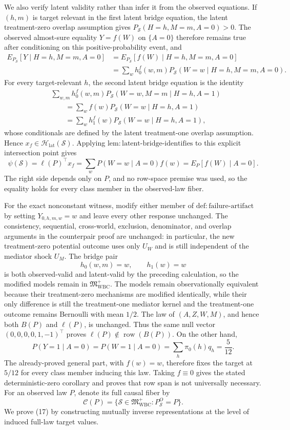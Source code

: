 We also verify latent validity rather than infer it from the observed
equations.  If \((h,m)\) is target relevant in the first latent bridge
equation, the latent treatment-zero overlap assumption gives
\(P_{\mathcal S}(H=h,M=m,A=0)>0\).  The observed almost-sure equality
\(Y=f(W)\) on \(\{A=0\}\) therefore remains true after conditioning on
this positive-probability event, and
\[
\begin{aligned}
 E_{P_{\mathcal S}}[Y\mid H=h,M=m,A=0]
 &=E_{P_{\mathcal S}}[f(W)\mid H=h,M=m,A=0]\\
 &=\sum_w h_0^f(w,m)
 P_{\mathcal S}(W=w\mid H=h,M=m,A=0).
\end{aligned}
\]
For every target-relevant \(h\), the second latent bridge equation is the
identity
\[
\begin{aligned}
 &\sum_{w,m}h_0^f(w,m)
 P_{\mathcal S}(W=w,M=m\mid H=h,A=1)\\
 &\qquad=\sum_w f(w)P_{\mathcal S}(W=w\mid H=h,A=1)\\
 &\qquad=\sum_w h_1^f(w)P_{\mathcal S}(W=w\mid H=h,A=1),
\end{aligned}
\]
whose conditionals are defined by the latent treatment-one overlap
assumption.  Hence
\(x_f\in\mathcal H_{\mathrm{lat}}(\mathcal S)\).  Applying
\(\mathrm{lem{:}latent\text{-}bridge\text{-}identifies}\) to this explicit
intersection point gives
\[
 \psi(\mathcal S)=\ell(P)^{\top}x_f
 =\sum_w P(W=w\mid A=0)f(w)
 =E_P[f(W)\mid A=0].
\]
The right side depends only on \(P\), and no row-space premise was used, so
the equality holds for every class member in the observed-law fiber.

For the exact nonconstant witness, modify either member of
\(\mathrm{def{:}failure\text{-}artifact}\) by setting
\(Y_{0,h,m,w}=w\) and leave every other response unchanged.  The consistency,
sequential, cross-world, exclusion, denominator, and overlap arguments in the
counterpair proof are unchanged: in particular, the new treatment-zero
potential outcome uses only \(U_W\) and is still independent of the mediator
shock \(U_M\).  The bridge pair
\[
 h_0(w,m)=w,\qquad h_1(w)=w
\]
is both observed-valid and latent-valid by the preceding calculation, so the
modified models remain in \(\mathfrak M_{\mathrm{WBC}}^{+}\).  The models
remain observationally equivalent because their treatment-zero mechanisms
are modified identically, while their only difference is still the
treatment-one mediator kernel and the treatment-one outcome remains
Bernoulli with mean \(1/2\).  The law of \((A,Z,W,M)\), and hence both
\(B(P)\) and \(\ell(P)\), is unchanged.  Thus the same null vector
\((0,0,0,0,1,-1)^{\top}\) proves
\(\ell(P)\notin\operatorname{row}(B(P))\).  On the other hand,
\[
 P(Y=1\mid A=0)=P(W=1\mid A=0)
 =\sum_h\pi _0(h)q_h=\frac5{12}.
\]
The already-proved general part, with \(f(w)=w\), therefore fixes the target
at \(5/12\) for every class member inducing this law.  Taking \(f\equiv0\)
gives the stated deterministic-zero corollary and proves that row span is not
universally necessary.
For an observed law \(P\), denote its full causal fiber by
\[
 \mathcal C(P)=\{\mathcal S\in\mathfrak M_{\mathrm{WBC}}^{+}:
 P_{\mathcal S}^O=P\}.
\]
We prove (17) by constructing mutually inverse representations at the level
of induced full-law target values.

